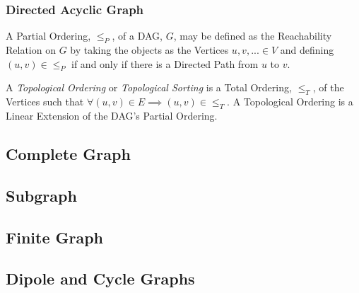 \subsubsection{Directed Acyclic Graph} \label{sec:dag}

A Partial Ordering, $\leq_P$, of a DAG, $G$, may be defined as the
Reachability Relation on $G$ by taking the objects as the Vertices
$u,v,... \in V$ and defining $(u,v) \in \leq_P$ if and only if there
is a Directed Path from $u$ to $v$.

A \emph{Topological Ordering} or \emph{Topological Sorting} is a Total
Ordering, $\leq_T$, of the Vertices such that $\forall (u,v) \in E
\implies (u,v) \in \leq_T$. A Topological Ordering is a Linear
Extension of the DAG's Partial Ordering. %



\subsection{Complete Graph} \label{sec:complete_graph}

\subsection{Subgraph} \label{sec:subgraphs}

\subsection{Finite Graph} \label{sec:finite_graph}

\subsection{Dipole and Cycle Graphs} \label{sec:dipole_cycle_graph}



